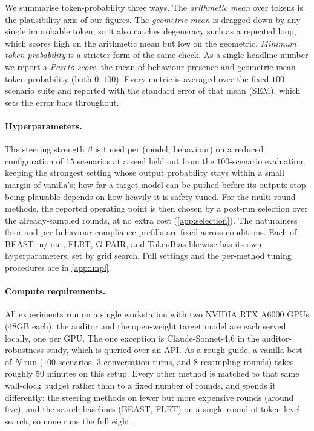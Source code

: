 \documentclass{article}
\theoremstyle{plain}
\theoremstyle{definition}
\theoremstyle{remark}
\begin{document}
We summarise token-probability three ways. The \emph{arithmetic mean} over tokens is the plausibility axis of our figures. The \emph{geometric mean} is dragged down by any single improbable token, so it also catches degeneracy such as a repeated loop, which scores high on the arithmetic mean but low on the geometric. \emph{Minimum token-probability} is a stricter form of the same check. As a single headline number we report a \emph{Pareto score}, the mean of behaviour presence and geometric-mean token-probability (both $0$--$100$). Every metric is averaged over the fixed $100$-scenario suite and reported with the standard error of that mean (SEM), which sets the error bars throughout.


\paragraph{Hyperparameters.} The steering strength $\beta$ is tuned per (model, behaviour) on a reduced configuration of $15$ scenarios at a seed held out from the $100$-scenario evaluation, keeping the strongest setting whose output probability stays within a small margin of vanilla's; how far a target model can be pushed before its outputs stop being plausible depends on how heavily it is safety-tuned. For the multi-round methods, the reported operating point is then chosen by a post-run selection over the already-sampled rounds, at no extra cost (\cref{app:selection}). The naturalness floor and per-behaviour compliance prefills are fixed across conditions. Each of BEAST-in/-out, FLRT, G-PAIR, and TokenBias likewise has its own hyperparameters, set by grid search. Full settings and the per-method tuning procedures are in \cref{app:impl}.


\paragraph{Compute requirements.} All experiments run on a single workstation with two NVIDIA RTX A6000 GPUs (48GB each): the auditor and the open-weight target model are each served locally, one per GPU. The one exception is Claude-Sonnet-4.6 in the auditor-robustness study, which is queried over an API.
As a rough guide, a vanilla best-of-$N$ run ($100$ scenarios, $3$ conversation turns, and $8$ resampling rounds) takes roughly $50$ minutes on this setup. Every other method is matched to that same wall-clock budget rather than to a fixed number of rounds, and spends it differently: the steering methods on fewer but more expensive rounds (around five), and the search baselines (BEAST, FLRT) on a single round of token-level search, so none runs the full eight.
\end{document}
